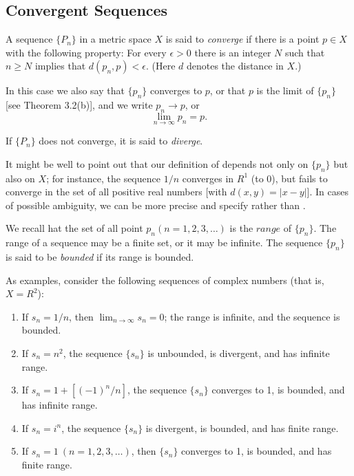 \documentclass[../poma-notes.tex]{subfiles}
\begin{document}
\subsection*{Convergent Sequences}

\begin{definition}
  A sequence $\{P_n\}$ in a metric space $X$ is said to \textit{converge} if there is a point $p \in X$ with the
  following property: For every $\epsilon > 0$ there is an integer $N$ such that $n \ge N$ implies that
  $d(p_n,p) < \epsilon$. (Here $d$ denotes the distance in $X$.)

  In this case we also say that $\{p_n\}$ converges to $p$, or that $p$ is the limit of $\{p_n\}$
  [see Theorem 3.2(b)], and we write $p_n \to p$, or
  \[\lim_{n \to \infty} p_n = p.\]

  If $\{P_n\}$ does not converge, it is said to \textit{diverge}.

  It might be well to point out that our definition of  depends not only on $\{p_n\}$
  but also on $X$; for instance, the sequence ${1/n}$ converges in $R^1$ (to $0$), but fails to converge in the set
  of all positive real numbers [with $d(x,y)=|x-y|$]. In cases of possible ambiguity, we can be more precise and
  specify  rather than .

  We recall hat the set of all point $p_n (n=1,2,3,\dots)$ is the $\textit{range}$ of $\{p_n\}$. The range of a
  sequence may be a finite set, or it may be infinite. The sequence $\{p_n\}$ is said to be \textit{bounded} if
  its range is bounded.

  As examples, consider the following sequences of complex numbers (that is, $X = R^2$):
  \begin{enumerate}[label=(\alph*)]
    \item If $s_n = 1/n$, then $\lim_{n \to \infty} s_n = 0$; the range is infinite, and the sequence is bounded.
    \item If $s_n = n^2$, the sequence $\{s_n\}$ is unbounded, is divergent, and has infinite range.
    \item If $s_n = 1 + [(-1)^n/n]$, the sequence $\{s_n\}$ converges to 1, is bounded, and has infinite range.
    \item If $s_n = i^n$, the sequence $\{s_n\}$ is divergent, is bounded, and has finite range.
    \item If $s_n = 1\ (n=1,2,3,\dots)$, then $\{s_n\}$ converges to 1, is bounded, and has finite range.
  \end{enumerate}
\end{definition}
\end{document}
